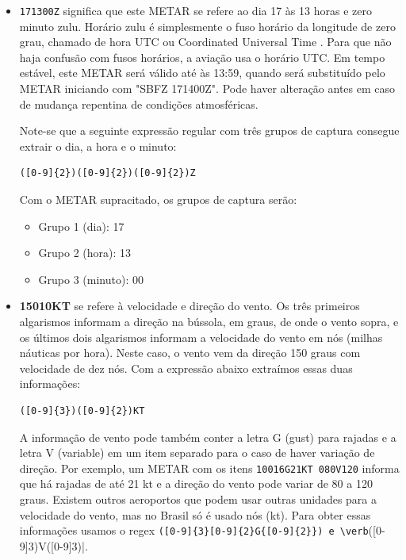 \begin{itemize}
\item \texttt{171300Z} significa que este METAR se refere ao dia 17 às 13 horas e zero 
minuto zulu. Horário zulu é simplesmente o fuso horário da longitude de zero grau, 
chamado de hora UTC ou Coordinated Universal Time \cite{UTC}. Para que não haja 
confusão com fusos horários, a aviação usa o horário UTC. Em tempo
estável, este 
METAR será válido até às 13:59, quando será substituído pelo METAR iniciando com 
"SBFZ 171400Z". Pode haver alteração antes em caso de mudança repentina de condições 
atmosféricas.

Note-se que a seguinte expressão regular com três grupos de captura consegue extrair 
o dia, a hora e o minuto:

\begin{verbatim}
([0-9]{2})([0-9]{2})([0-9]{2})Z
\end{verbatim}

Com o METAR supracitado, os grupos de captura serão:

\begin{itemize}
\item Grupo 1 (dia): 17
\item Grupo 2 (hora): 13
\item Grupo 3 (minuto): 00
\end{itemize}

\item \textbf{15010KT} se refere à velocidade e direção do vento. Os três primeiros 
algarismos informam a direção na bússola, em graus, de onde o vento sopra, e os 
últimos dois algarismos informam a velocidade do vento em nós (milhas náuticas por hora). 
Neste caso, o vento vem da direção 150 graus com velocidade de dez nós. Com a 
expressão abaixo extraímos essas duas informações:

\begin{verbatim}
([0-9]{3})([0-9]{2})KT
\end{verbatim}

A informação de vento pode também conter a letra G (gust) para rajadas e a letra 
V (variable) em um item separado para o caso de haver variação de direção. Por 
exemplo, um METAR com os itens \texttt{10016G21KT 080V120} informa que há rajadas 
de até 21 kt e a direção do vento pode variar de 80 a 120 graus. Existem outros 
aeroportos que podem usar outras unidades para a velocidade do vento, mas no 
Brasil só é usado nós (kt). Para obter essas informações usamos o regex 
\verb|([0-9]{3}[0-9]{2}G{[0-9]{2}}) e \verb|([0-9]{3})V([0-9]{3})|.


\end{itemize}
